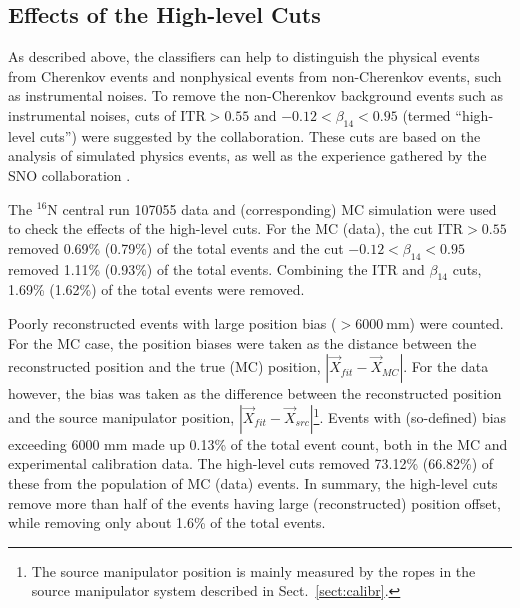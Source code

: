 \subsection{Effects of the High-level Cuts}

As described above, the classifiers can help to distinguish the physical events from Cherenkov events and nonphysical events from non-Cherenkov events, such as instrumental noises. To remove the non-Cherenkov background events such as instrumental noises, cuts of $\mathrm{ITR}>0.55$ and $-0.12<\beta_{14}<0.95$ (termed ``high-level cuts'') were suggested by the collaboration\cite{waterunidoc}. These cuts are based on the analysis of simulated physics events, as well as the experience gathered by the SNO collaboration \cite{waterunidoc,marzec2019measurement,dunmore2004separation}. %

The $^{16}$N central run 107055 data and (corresponding) MC simulation were used to check the effects of the high-level cuts. For the MC (data), the cut ITR$>0.55$ removed 0.69\% (0.79\%) of the total events and the cut $-0.12<\beta_{14}<0.95$ removed 1.11\% (0.93\%) of the total events. Combining the ITR and $\beta_{14}$ cuts, 1.69\% (1.62\%) of the total events were removed.

Poorly reconstructed events with large position bias ($>6000~$mm) were counted. For the MC case, the position biases were taken as the distance between the reconstructed position and the true (MC) position, $|\vec{X}_{fit}-\vec{X}_{MC}|$. For the data however, the bias was taken as the difference between the reconstructed position and the source manipulator position, $|\vec{X}_{fit}-\vec{X}_{src}|$\footnote{The source manipulator position is mainly measured by the ropes in the source manipulator system described in Sect.~\ref{sect:calibr}.}. Events with (so-defined) bias exceeding 6000 mm made up 0.13\% of the total event count, both in the MC and experimental calibration data. The high-level cuts removed 73.12\% (66.82\%) of these from the population of MC (data) events. In summary, the high-level cuts remove more than half of the events having large (reconstructed) position offset, while removing only about 1.6\% of the total events. 

